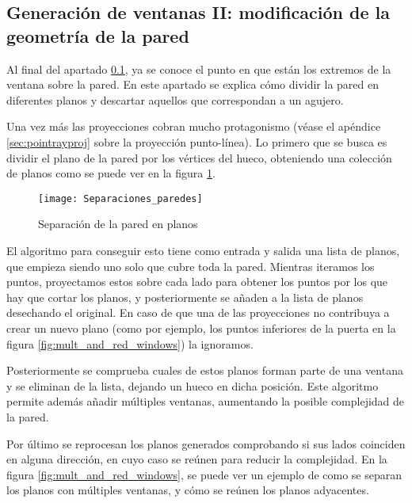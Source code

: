 \subsection{Generación de ventanas II: modificación de la geometría de la pared}
\label{sec:wallgenwindowsii}

Al final del apartado \ref{sec:wallgenwindowsii}, ya se conoce el punto en que están los extremos de la ventana sobre la pared. En este apartado se explica cómo dividir la pared en diferentes planos y descartar aquellos que correspondan a un agujero.

Una vez más las proyecciones cobran mucho protagonismo (véase el apéndice \ref{sec:pointrayproj} sobre la proyección punto-línea). Lo primero que se busca es dividir el plano de la pared por los vértices del hueco, obteniendo una colección de planos como se puede ver en la figura \ref{fig:wall_separacion}.

\begin{figure}[H]
    \centering
    \texttt{[image: Separaciones\_paredes]}
    \caption{Separación de la pared en planos}
    \label{fig:wall_separacion}
\end{figure}

El algoritmo para conseguir esto tiene como entrada y salida una lista de planos, que empieza siendo uno solo que cubre toda la pared. Mientras iteramos los puntos, proyectamos estos sobre cada lado para obtener los puntos por los que hay que cortar los planos, y posteriormente se añaden a la lista de planos desechando el original. En caso de que una de las proyecciones no contribuya a crear un nuevo plano (como por ejemplo, los puntos inferiores de la puerta en la figura \ref{fig:mult_and_red_windows}) la ignoramos.

Posteriormente se comprueba cuales de estos planos forman parte de una ventana y se eliminan de la lista, dejando un hueco en dicha posición. Este algoritmo permite además añadir múltiples ventanas, aumentando la posible complejidad de la pared.

Por último se reprocesan los planos generados comprobando si sus lados coinciden en alguna dirección, en cuyo caso se reúnen para reducir la complejidad. En la figura \ref{fig:mult_and_red_windows}, se puede ver un ejemplo de como se separan los planos con múltiples ventanas, y cómo se reúnen los planos adyacentes.

